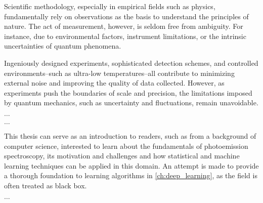 Scientific methodology, especially in empirical fields such as physics, fundamentally rely on observations as the basis to understand the principles of nature. The act of measurement, however, is seldom free from ambiguity. For instance, due to environmental factors, instrument limitations, or the intrinsic uncertainties of quantum phenomena. 

Ingeniously designed experiments, sophisticated detection schemes, and controlled environments--such as ultra-low temperatures--all contribute to minimizing external noise and improving the quality of data collected. However, as experiments push the boundaries of scale and precision, the limitations imposed by quantum mechanics, such as uncertainty and fluctuations, remain unavoidable.

$\dots$






$\dots$

This thesis can serve as an introduction to readers, such as from a background of computer science, interested to learn about the fundamentals of photoemission spectroscopy, its motivation and challenges and how statistical and machine learning techniques can be applied in this domain. An attempt is made to provide a thorough foundation to learning algorithms in \cref{ch:deep_learning}, as the field is often treated as black box.

$\dots$